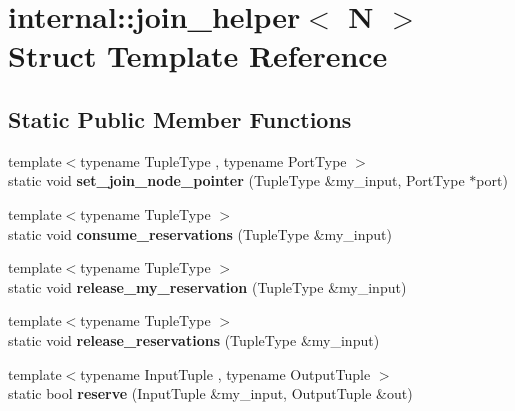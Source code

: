 \hypertarget{structinternal_1_1join__helper}{}\section{internal\+:\+:join\+\_\+helper$<$ N $>$ Struct Template Reference}
\label{structinternal_1_1join__helper}
\subsection*{Static Public Member Functions}
\begin{DoxyCompactItemize}
\item 
\hypertarget{structinternal_1_1join__helper_a86aa13569a535b1aa6c74f28ca627409}{}{\footnotesize template$<$typename Tuple\+Type , typename Port\+Type $>$ }\\static void {\bfseries set\+\_\+join\+\_\+node\+\_\+pointer} (Tuple\+Type \&my\+\_\+input, Port\+Type $\ast$port)\label{structinternal_1_1join__helper_a86aa13569a535b1aa6c74f28ca627409}

\item 
\hypertarget{structinternal_1_1join__helper_ad7d55075cf5d6ae85944a27d50dc0df0}{}{\footnotesize template$<$typename Tuple\+Type $>$ }\\static void {\bfseries consume\+\_\+reservations} (Tuple\+Type \&my\+\_\+input)\label{structinternal_1_1join__helper_ad7d55075cf5d6ae85944a27d50dc0df0}

\item 
\hypertarget{structinternal_1_1join__helper_afd823cb6e5ce826dfa729c914fb6cfa4}{}{\footnotesize template$<$typename Tuple\+Type $>$ }\\static void {\bfseries release\+\_\+my\+\_\+reservation} (Tuple\+Type \&my\+\_\+input)\label{structinternal_1_1join__helper_afd823cb6e5ce826dfa729c914fb6cfa4}

\item 
\hypertarget{structinternal_1_1join__helper_a4dcc44eeceaa5f87160c7bc3c004432c}{}{\footnotesize template$<$typename Tuple\+Type $>$ }\\static void {\bfseries release\+\_\+reservations} (Tuple\+Type \&my\+\_\+input)\label{structinternal_1_1join__helper_a4dcc44eeceaa5f87160c7bc3c004432c}

\item 
\hypertarget{structinternal_1_1join__helper_a1128b8d329973b0307e0ac64c1390274}{}{\footnotesize template$<$typename Input\+Tuple , typename Output\+Tuple $>$ }\\static bool {\bfseries reserve} (Input\+Tuple \&my\+\_\+input, Output\+Tuple \&out)\label{structinternal_1_1join__helper_a1128b8d329973b0307e0ac64c1390274}


\end{DoxyCompactItemize}
